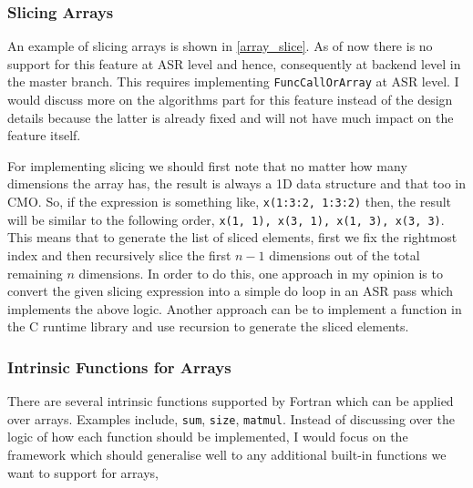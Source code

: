 



\subsubsection{Slicing Arrays}

An example of slicing arrays is shown in \ref{array_slice}. As of now there is no support for this feature at ASR level and hence, consequently at backend level in the master branch. This requires implementing \texttt{FuncCallOrArray} at ASR level. I would discuss more on the algorithms part for this feature instead of the design details because the latter is already fixed and will not have much impact on the feature itself.

For implementing slicing we should first note that no matter how many dimensions the array has, the result is always a 1D data structure and that too in CMO. So, if the expression is something like, \texttt{x(1:3:2, 1:3:2)} then, the result will be similar to the following order, \texttt{x(1, 1), x(3, 1), x(1, 3), x(3, 3)}. This means that to generate the list of sliced elements, first we fix the rightmost index and then recursively slice the first $n - 1$ dimensions out of the total remaining $n$ dimensions. In order to do this, one approach in my opinion is to convert the given slicing expression into a simple do loop in an ASR pass which implements the above logic. Another approach can be to implement a function in the C runtime library and use recursion to generate the sliced elements.



\subsubsection{Intrinsic Functions for Arrays}

There are several intrinsic functions supported by Fortran which can be applied over arrays. Examples include, \texttt{sum}, \texttt{size}, \texttt{matmul}. Instead of discussing over the logic of how each function should be implemented, I would focus on the framework which should generalise well to any additional built-in functions we want to support for arrays,

